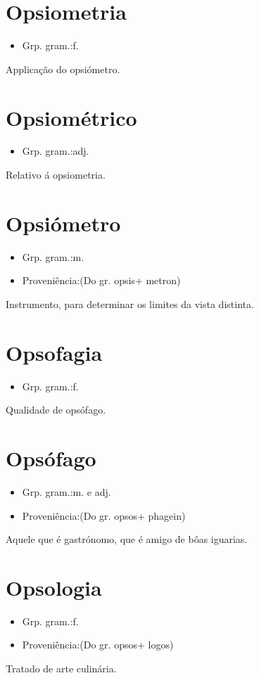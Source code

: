 \section{Opsiometria}
\begin{itemize}
\item {Grp. gram.:f.}
\end{itemize}
Applicação do opsiómetro.
\section{Opsiométrico}
\begin{itemize}
\item {Grp. gram.:adj.}
\end{itemize}
Relativo á opsiometria.
\section{Opsiómetro}
\begin{itemize}
\item {Grp. gram.:m.}
\end{itemize}
\begin{itemize}
\item {Proveniência:(Do gr. \textunderscore opsis\textunderscore  + \textunderscore metron\textunderscore )}
\end{itemize}
Instrumento, para determinar os limites da vista distinta.
\section{Opsofagia}
\begin{itemize}
\item {Grp. gram.:f.}
\end{itemize}
Qualidade de opsófago.
\section{Opsófago}
\begin{itemize}
\item {Grp. gram.:m.  e  adj.}
\end{itemize}
\begin{itemize}
\item {Proveniência:(Do gr. \textunderscore opsos\textunderscore  + \textunderscore phagein\textunderscore )}
\end{itemize}
Aquele que é gastrónomo, que é amigo de bôas iguarias.
\section{Opsologia}
\begin{itemize}
\item {Grp. gram.:f.}
\end{itemize}
\begin{itemize}
\item {Proveniência:(Do gr. \textunderscore opsos\textunderscore  + \textunderscore logos\textunderscore )}
\end{itemize}
Tratado de arte culinária.
